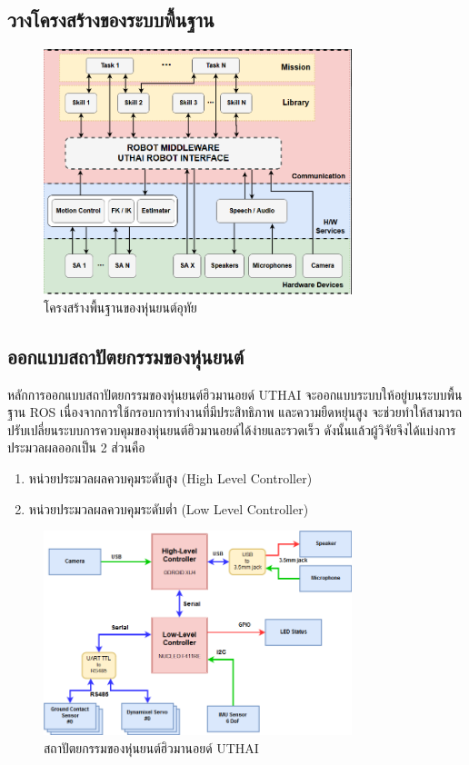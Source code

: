 \subsection{วางโครงสร้างของระบบพื้นฐาน}
\begin{figure}[!ht]
	\centering
	\includegraphics[width=0.8\textwidth]{chapter3/images/uthai_diagram.png}
	\caption{โครงสร้างพื้นฐานของหุ่นยนต์อุทัย}
	\label{fig:uthai_diagram}
\end{figure}

\clearpage
\subsection{ออกแบบสถาปัตยกรรมของหุ่นยนต์}
หลักการออกแบบสถาปัตยกรรมของหุ่นยนต์ฮิวมานอยด์ UTHAI จะออกแบบระบบให้อยู่บนระบบพื้นฐาน ROS
เนื่องจากการใช้กรอบการทำงานที่มีประสิทธิภาพ และความยืดหยุ่นสูง จะช่วยทำให้สามารถปรับเปลี่ยนระบบการควบคุมของหุ่นยนต์ฮิวมานอยด์ได้ง่ายและรวดเร็ว
ดังนั้นแล้วผู้วิจัยจึงได้แบ่งการประมวลผลออกเป็น 2 ส่วนคือ
\begin{enumerate}[label=\arabic*, leftmargin=1.5cm]\setlength\itemsep{-0.25em}
	\item หน่วยประมวลผลควบคุมระดับสูง (High Level Controller)
	\item หน่วยประมวลผลควบคุมระดับต่ำ (Low Level Controller)
\end{enumerate}
\begin{figure}[!ht]
	\centering
	\includegraphics[width=0.8\textwidth]{chapter3/images/uthai_argitec.png}
	\caption{สถาปัตยกรรมของหุ่นยนต์ฮิวมานอยด์ UTHAI}
	\label{fig:uthai_argitec}
\end{figure}

